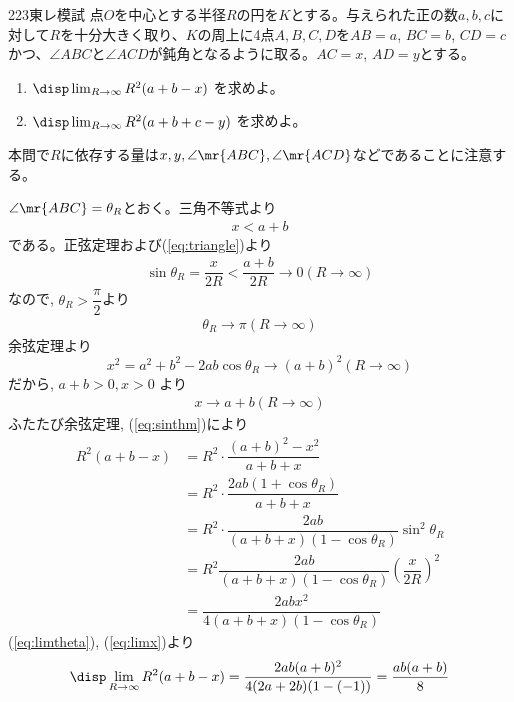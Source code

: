 \begin{thm}{223}{}{東レ模試}
 点$O$を中心とする半径$R$の円を$K$とする。与えられた正の数$a, b, c$に対して$R$を十分大きく取り、$K$の周上に4点$A, B, C, D$を$AB=a$, $BC=b$, $CD=c$かつ、$\angle{ABC}$と$\angle{ACD}$が鈍角となるように取る。$AC=x$, $AD=y$とする。
 \begin{enumerate}
  \item $\disp \lim_{R\to\infty} R^2(a+b-x)$ を求めよ。
  \item $\disp \lim_{R\to\infty} R^2(a+b+c-y)$ を求めよ。
 \end{enumerate}
\end{thm}

本問で$R$に依存する量は$x,y,\angle{\mr{ABC}},\angle{\mr{ACD}}$などであることに注意する。

$\angle{\mr{ABC}}=\theta_R$とおく。三角不等式より
\begin{eqnarray}
x<a+b\label{eq:triangle}
\end{eqnarray}
である。正弦定理および(\ref{eq:triangle})より
\begin{eqnarray}
\sin{\theta_R}=\dfrac{x}{2R}<\dfrac{a+b}{2R} \to 0　(R\to\infty)\label{eq:sinthm}
\end{eqnarray}
なので, $\theta_R>\dfrac{\pi}{2}$より
\begin{eqnarray}
\theta_R\to\pi　(R\to\infty)\label{eq:limtheta}
\end{eqnarray}
余弦定理より
\[x^2=a^2+b^2-2ab\cos{\theta_R}\to (a+b)^2　(R\to\infty)\]
だから, $a+b>0, x>0$ より 
\begin{eqnarray}
x\to a+b　(R\to\infty)\label{eq:limx}
\end{eqnarray}
ふたたび余弦定理, (\ref{eq:sinthm})により
\begin{align*}
 R^2(a+b-x)&=R^2\cdot\dfrac{(a+b)^2-x^2}{a+b+x}\\
 &=R^2\cdot\dfrac{2ab(1+\cos{\theta_R})}{a+b+x}\\
 &= R^2\cdot\dfrac{2ab}{(a+b+x)(1-\cos{\theta_R})}\sin^2{\theta_R}\\
 &= R^2\dfrac{2ab}{(a+b+x)(1-\cos{\theta_R})}\left(\dfrac{x}{2R}\right)^2\\
 &= \dfrac{2abx^2}{4(a+b+x)(1-\cos{\theta_R})}
\end{align*}
(\ref{eq:limtheta}), (\ref{eq:limx})より
\[\disp\lim_{R\to\infty}R^2(a+b-x)=\dfrac{2ab(a+b)^2}{4(2a+2b)(1-(-1))}=\dfrac{ab(a+b)}{8}\]

